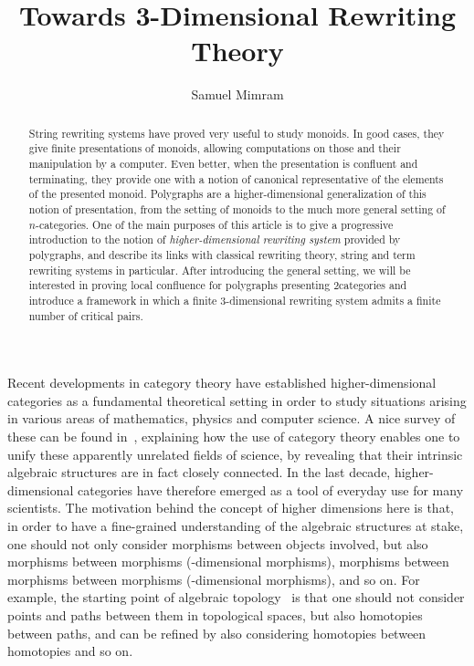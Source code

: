 \documentclass{LMCS}
\title[Towards 3-Dimensional Rewriting Theory]
      {Towards 3-Dimensional Rewriting Theory}
\author[S.~Mimram]{Samuel Mimram}
\begin{document}
\begin{abstract}
  String rewriting systems have proved very useful to study monoids. In good
  cases, they give finite presentations of monoids, allowing computations on
  those and their manipulation by a computer. Even better, when the presentation
  is confluent and terminating, they provide one with a notion of canonical
  representative of the elements of the presented monoid. Polygraphs are a
  higher-dimensional generalization of this notion of presentation, from the
  setting of monoids to the much more general setting of $n$-categories. One of
  the main purposes of this article is to give a progressive introduction to the
  notion of \emph{higher-dimensional rewriting system} provided by polygraphs,
  and describe its links with classical rewriting theory, string and term
  rewriting systems in particular. After introducing the general setting, we
  will be interested in proving local confluence for polygraphs presenting
  2\nbd{}categories and introduce a framework in which a finite 3-dimensional
  rewriting system admits a finite number of critical pairs.
\end{abstract}

\maketitle

Recent developments in category theory have established higher-dimensional
categories as a fundamental theoretical setting in order to study situations
arising in various areas of mathematics, physics and computer science. A nice
survey of these can be found in~\cite{baez:rosetta-stone}, explaining how the
use of category theory enables one to unify these apparently unrelated fields of
science, by revealing that their intrinsic algebraic structures are in fact
closely connected. In the last decade, higher-dimensional categories have
therefore emerged as a tool of everyday use for many scientists. The motivation
behind the concept of higher dimensions here is that, in order to have a
fine-grained understanding of the algebraic structures at stake, one should not
only consider morphisms between objects involved, but also morphisms between
morphisms (-dimensional morphisms), morphisms between morphisms between
morphisms (-dimensional morphisms), and so on. For example, the starting
point of algebraic topology~\cite{hatcher:algebraic-topology} is that one should
not consider points and paths between them in topological spaces, but also
homotopies between paths, and can be refined by also considering homotopies
between homotopies and so on.
\end{document}
